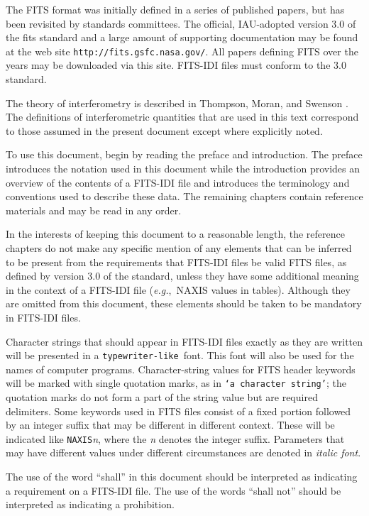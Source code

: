 \documentclass[twoside]{article}
\newcommand{\Hi}[1]{\textcolor{hicol}{#1}}
\newcommand{\eg}{{\it e.g.},}
\begin{document}
\Hi{The FITS format was initially defined in a series of published
papers, but has been revisited by standards committees.  The official,
IAU-adopted version 3.0 of the fits standard \cite{Fst08} and a large
amount of supporting documentation may be found at the web site
{\tt http://fits.gsfc.nasa.gov/}.  All papers defining FITS over the
years may be downloaded via this site.  FITS-IDI files must conform to
the 3.0 standard.}

The theory of interferometry is described in Thompson, Moran, and
Swenson \cite{TMS01}.  The definitions of interferometric quantities
that are used in this text correspond to those assumed in the present
document except where explicitly noted.

To use this document, begin by reading the preface and introduction.
The preface introduces the notation used in this document while the
introduction provides an overview of the contents of a FITS-IDI file
and introduces the terminology and conventions used to describe these
data.  The remaining chapters contain reference materials and may be
read in any order.

In the interests of keeping this document to a reasonable length, the
reference chapters do not make any specific mention of any elements
that can be inferred to be present from the requirements that FITS-IDI
files be valid FITS files, as defined by version 3.0 of the standard,
unless they have some additional meaning in the context of a FITS-IDI
file (\eg\ NAXIS values in tables).  Although they are omitted from
this document, these elements should be taken to be mandatory in
FITS-IDI files.

Character strings that should appear in FITS-IDI files exactly as they
are written will be presented in a {\tt typewriter-like }font.  This
font will also be used for the names of computer programs.
Character-string values for FITS header keywords will be marked with
single quotation marks, as in {\tt `a character string'}; the
quotation marks do not form a part of the string value \Hi{but are
required delimiters}.  Some keywords used in FITS files consist of a
fixed portion followed by an integer suffix that may be different in
different context.  These will be indicated like {\tt NAXIS}{\it n},
where the {\it n} denotes the integer suffix.  Parameters that may
have different values under different circumstances are denoted in
{\it italic font}.

The use of the word ``shall'' in this document should be interpreted
as indicating a requirement on a FITS-IDI file.  The use of the words
``shall not'' should be interpreted as indicating a prohibition.
\end{document}
